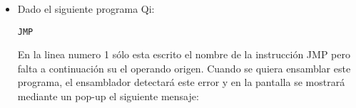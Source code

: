 \begin{itemize}

\item Dado el siguiente programa Qi:

\begin{verbatim}
JMP
\end{verbatim}

En la linea numero 1 sólo esta escrito el nombre de la instrucción JMP pero falta a continuación su el operando origen. Cuando se quiera ensamblar este programa, el ensamblador detectará este error y en la pantalla se mostrará mediante un pop-up el siguiente mensaje:

 

\end{itemize}